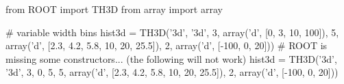 \begin{footnotesize}
\begin{pyglist}[language=python,texcl=true,abovecaptionskip=0,style=vs,bgcolor=Moccasin]
from ROOT import TH3D
from array import array

# variable width bins
hist3d = TH3D('3d', '3d', 3, array('d', [0, 3, 10, 100]),
                          5, array('d', [2.3, 4.2, 5.8, 10, 20, 25.5]),
                          2, array('d', [-100, 0, 20]))
# ROOT is missing some constructors... (the following will not work)
hist3d = TH3D('3d', '3d', 3, 0, 5,
                          5, array('d', [2.3, 4.2, 5.8, 10, 20, 25.5]),
                          2, array('d', [-100, 0, 20]))
\end{pyglist}
\end{footnotesize}

